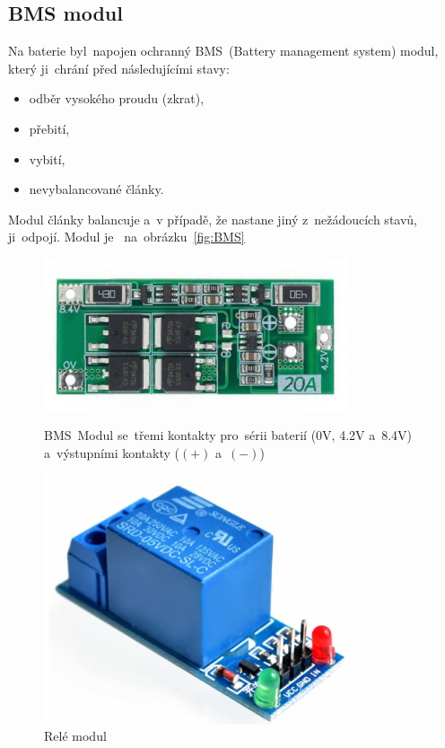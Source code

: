 \subsection{BMS modul}
Na baterie  byl~napojen ochranný  BMS~(Battery management system) modul, který ji~chrání před následujícími stavy:
\begin{itemize}
  \item odběr vysokého proudu (zkrat),
  \item přebití,
  \item vybití,
  \item nevybalancované články.
\end{itemize}
Modul články balancuje  a~v případě, že nastane jiný  z~nežádoucích stavů, ji~odpojí. Modul je ~na~obrázku~\ref{fig:BMS}


\begin{figure}[htb]
  \centering
  \begin{minipage}{0.45\textwidth}
    \centering
  \includegraphics[width=0.8\textwidth]{img/BMS.jpg}
  \caption{\label{fig:BMS}  BMS~Modul se~třemi kontakty  pro~sérii baterií (0V, 4.2V  a~8.4V)  a~výstupními kontakty ($(+)$  a~$(-)$)~\cite{laskakit-BMS}}
  \end{minipage}\hfill
  \begin{minipage}{0.45\textwidth}
    \centering
  \includegraphics[width=0.8\textwidth]{img/relay.jpg}
  \caption{\label{fig:relay} Relé modul~\cite{laskakit-relay}}
  \end{minipage}
\end{figure}

